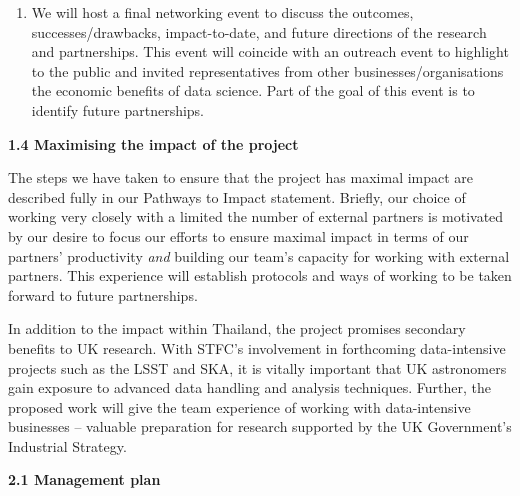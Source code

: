 \documentclass[11pt]{article}
\begin{document}
\begin{enumerate}[leftmargin=6mm,itemsep=0pt,topsep=1pt]
  \item We will host a final networking event to discuss the outcomes, successes/drawbacks, impact-to-date, and future directions of the research and partnerships. This event will coincide with an outreach event to highlight to the public and invited representatives from other businesses/organisations the economic benefits of data science. Part of the goal of this event is to identify future partnerships.
  \end{enumerate}
  
  \vspace{3mm}
  \noindent
  {\large \bf 1.4 Maximising the impact of the project}
  
  \noindent
  The steps we have taken to ensure that the project has maximal impact are described fully in our Pathways to Impact statement. Briefly, our choice of working very closely with a limited the number of external partners is motivated by our desire to focus our efforts to ensure maximal impact in terms of our partners' productivity {\it and} building our team's capacity for working with external partners. This experience will establish protocols and ways of working to be taken forward to future partnerships.

  
  \vspace{2mm}
  \noindent
  In addition to the impact within Thailand, the project promises secondary benefits to UK research. With STFC's involvement in forthcoming data-intensive projects such as the LSST and SKA, it is vitally important that UK astronomers gain exposure to advanced data handling and analysis techniques. Further, the proposed work will give the team experience of working with data-intensive businesses -- valuable preparation for research supported by the UK Government's Industrial Strategy.
  
  \vspace{3mm}
  \noindent
  {\large \bf 2.1 Management plan}
    
\end{document}
